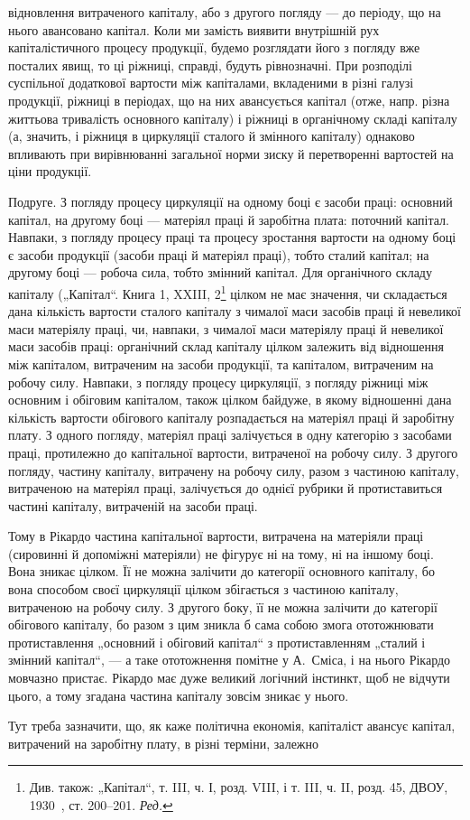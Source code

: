 \parcont{}  %
відновлення витраченого капіталу, або з другого погляду — до періоду,
що на нього авансовано капітал. Коли ми замість виявити внутрішній
рух капіталістичного процесу продукції, будемо розглядати його з погляду
вже посталих явищ, то ці ріжниці, справді, будуть рівнозначні. При
розподілі суспільної додаткової вартости між капіталами, вкладеними
в різні галузі продукції, ріжниці в періодах, що на них авансується
капітал (отже, напр. різна життьова тривалість основного капіталу) і
ріжниці в органічному складі капіталу (а, значить, і ріжниця в циркуляції
сталого й змінного капіталу) однаково впливають при вирівнюванні загальної
норми зиску й перетворенні вартостей на ціни продукції.

Подруге. З погляду процесу циркуляції на одному боці є засоби
праці: основний капітал, на другому боці — матеріял праці й заробітна
плата: поточний капітал. Навпаки, з погляду процесу праці та процесу
зростання вартости на одному боці є засоби продукції (засоби праці й
матеріял праці), тобто сталий капітал; на другому боці — робоча сила, тобто
змінний капітал. Для органічного складу капіталу („Капітал“. Книга 1,
XXIII, 2\footnote*{
Див. також: „Капітал“, т. III, ч. І, розд. VIII, і т. III, ч. II, розд. 45, ДВОУ,
1930~, ст. 200--201. \emph{Ред.}
} цілком не має значення, чи складається дана кількість вартости
сталого капіталу з чималої маси засобів праці й невеликої маси
матеріялу праці, чи, навпаки, з чималої маси матеріялу праці й невеликої
маси засобів праці: органічний склад капіталу цілком залежить від відношення
між капіталом, витраченим на засоби продукції, та капіталом, витраченим
на робочу силу. Навпаки, з погляду процесу циркуляції, з погляду
ріжниці між основним і обіговим капіталом, також цілком байдуже,
в якому відношенні дана кількість вартости обігового капіталу розпадається
на матеріял праці й заробітну плату. З одного погляду, матеріял
праці залічується в одну категорію з засобами праці, протилежно до
капітальної вартости, витраченої на робочу силу. З другого погляду,
частину капіталу, витрачену на робочу силу, разом з частиною капіталу,
витраченою на матеріял праці, залічується до однієї рубрики й протиставиться
частині капіталу, витраченій на засоби праці.

Тому в Рікардо частина капітальної вартости, витрачена на матеріяли
праці (сировинні й допоміжні матеріяли) не фігурує ні на тому, ні на іншому
боці. Вона зникає цілком. Її не можна залічити до категорії основного
капіталу, бо вона способом своєї циркуляції цілком збігається
з частиною капіталу, витраченою на робочу силу. З другого боку, її не
можна залічити до категорії обігового капіталу, бо разом з цим зникла
б сама собою змога ототожнювати протиставлення „основний і обіговий
капітал“ з протиставленням „сталий і змінний капітал“, — а таке ототожнення
помітне у А.~Сміса, і на нього Рікардо мовчазно пристає. Рікардо
має дуже великий логічний інстинкт, щоб не відчути цього, а тому згадана
частина капіталу зовсім зникає у нього.

Тут треба зазначити, що, як каже політична економія, капіталіст
авансує капітал, витрачений на заробітну плату, в різні терміни, залежно
\parbreak{}  %
